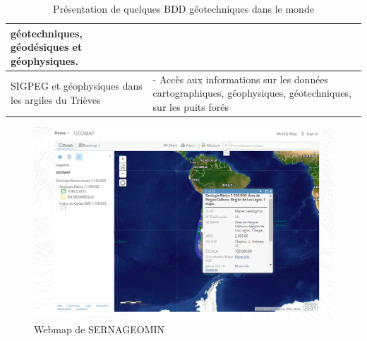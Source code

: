 \begin{table}
\begin{tabular}{|p{0.40\linewidth}|p{0.60\linewidth}|}
                        géotechniques, géodésiques et géophysiques.
                       \\
                \hline 
                SIGPEG
                et géophysiques dans les argiles du Trièves&
                        - Accès aux informations sur les données
                        cartographiques, géophysiques, géotechniques, sur les puits forés
                            \\
                \hline 
        \end{tabular}
        \caption{Présentation de quelques BDD géotechniques dans le monde} \label{tab:someBDD}
\end{table}
\par

\begin{figure}[t]
    \centering
    \includegraphics[width=1\textwidth]{images/Contexte/chili.png}
    \caption{Webmap de SERNAGEOMIN \cite{map2}}
    \label{fig:chili}
\end{figure}
